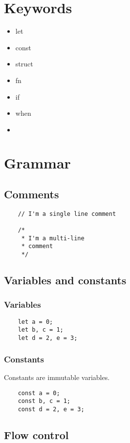 \documentclass{report}
\begin{document}
\chapter{Keywords}
\begin{itemize}
    \item{let}
    \item{const}
    \item{struct}
    \item{fn}
    \item{if}
    \item{when}
    \item
\end{itemize}


\chapter{Grammar}

\section{Comments}
\begin{verbatim}
    // I'm a single line comment

    /*
     * I'm a multi-line 
     * comment
     */
\end{verbatim}

\section {Variables and constants}

\subsection{Variables}
\begin{verbatim}
    let a = 0;
    let b, c = 1;
    let d = 2, e = 3;
\end{verbatim}
\subsection{Constants}
Constants are immutable variables.
\begin{verbatim}
    const a = 0;
    const b, c = 1;
    const d = 2, e = 3;
\end{verbatim}


\section{Flow control}
\end{document}
